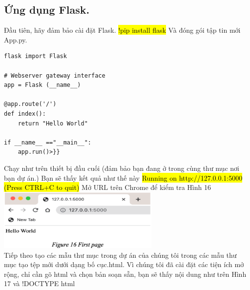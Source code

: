 \documentclass{article}
\begin{document}
\subsection{ Ứng dụng Flask.}
Đầu tiên, hãy đảm bảo cài đặt Flask.
\textcolor{white}{\hl{!pip install flask}} Và đóng gói tập tin mới App.py.
\begin{verbatim}
flask import Flask

# Webserver gateway interface
app = Flask (__name__)

@app.route('/')
def index():
    return "Hello World"

if __name__ =="__main__":
    app.run()>}}
\end{verbatim}
Chạy như trên thiết bị đầu cuối (đảm bảo bạn đang ở trong cùng thư mục nơi bạn dự án.) Bạn sẽ thấy kết quả như thế này \textcolor{white}{\hl{Running on http://127.0.0.1:5000 (Press CTRL+C to quit)}}
Mở URL trên Chrome để kiểm tra Hình 16\\
\includegraphics[width= 8cm]{img/img1/Screenshot 2024-11-20 193708.png}
\\
Tiếp theo tạo các mẫu thư mục trong dự án của chúng tôi trong các mẫu thư mục tạo tệp mới dưới dạng bố cục.html. Vì chúng tôi đã cài đặt các tiện ích mở rộng, chỉ cần gõ html và chọn bản soạn sẵn, bạn sẽ thấy nội dung như trên Hình 17 và !DOCTYPE html
\end{document}
